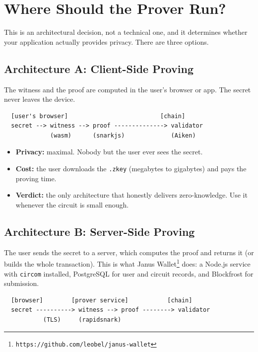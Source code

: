 \section{Where Should the Prover Run?} \label{sec:ch7-where}

This is an architectural decision, not a technical one, and it determines
whether your application actually provides privacy. There are three options.

\subsection*{Architecture A: Client-Side Proving}

The witness and the proof are computed in the user's browser or app. The secret
never leaves the device.

\begin{verbatim}
  [user's browser]                          [chain]
  secret --> witness --> proof --------------> validator
             (wasm)      (snarkjs)             (Aiken)
\end{verbatim}

\begin{itemize}
  \item \textbf{Privacy:} maximal. Nobody but the user ever sees the secret.
  \item \textbf{Cost:} the user downloads the \texttt{.zkey} (megabytes to
        gigabytes) and pays the proving time.
  \item \textbf{Verdict:} the only architecture that honestly delivers
        zero-knowledge. Use it whenever the circuit is small enough.
\end{itemize}

\subsection*{Architecture B: Server-Side Proving}

The user sends the secret to a server, which computes the proof and returns it
(or builds the whole transaction). This is what Janus
Wallet\footnote{\texttt{https://github.com/leobel/janus-wallet}} does: a
Node.js service with \texttt{circom} installed, PostgreSQL for user and circuit
records, and Blockfrost for submission.

\begin{verbatim}
  [browser]        [prover service]           [chain]
  secret ----------> witness --> proof --------> validator
           (TLS)     (rapidsnark)
\end{verbatim}

